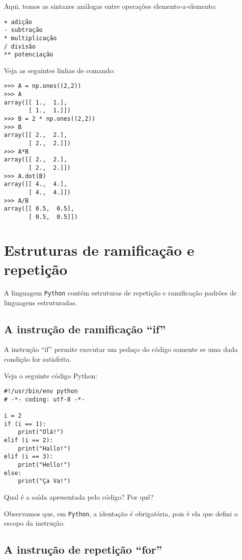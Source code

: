 Aqui, temos as sintaxes análogas entre operações elemento-a-elemento:
\begin{verbatim}
+ adição       
- subtração    
* multiplicação 
/ divisão
** potenciação
\end{verbatim}

\begin{ex}
  Veja as seguintes linhas de comando:
\begin{verbatim}
>>> A = np.ones((2,2))
>>> A
array([[ 1.,  1.],
       [ 1.,  1.]])
>>> B = 2 * np.ones((2,2))
>>> B
array([[ 2.,  2.],
       [ 2.,  2.]])
>>> A*B
array([[ 2.,  2.],
       [ 2.,  2.]])
>>> A.dot(B)
array([[ 4.,  4.],
       [ 4.,  4.]])
>>> A/B
array([[ 0.5,  0.5],
       [ 0.5,  0.5]])
\end{verbatim}
\end{ex}

\section{Estruturas de ramificação e repetição}

A linguagem \verb+Python+ contém estruturas de repetição e ramificação padrões de linguagens estruturadas.

\subsection{A instrução de ramificação ``if''}

A instrução ``if'' permite executar um pedaço do código somente se uma dada condição for satisfeita.

\begin{ex}
  Veja o seguinte código Python:
\begin{verbatim}
#!/usr/bin/env python
# -*- coding: utf-8 -*-

i = 2
if (i == 1):
    print("Olá!")
elif (i == 2):
    print("Hallo!")
elif (i == 3):
    print("Hello!")
else:
    print("Ça Va!")
\end{verbatim}
Qual é a saída apresentada pelo código? Por quê?
\end{ex}

Observamos que, em \verb+Python+, a identação é obrigatória, pois é ela que defini o escopo da instrução.

\subsection{A instrução de repetição ``for''}

